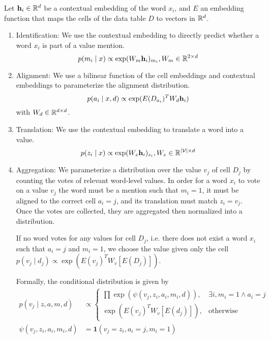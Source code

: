 \documentclass[12pt]{article}
\begin{document}
Let $\mathbf{h}_i \in \mathbb{R}^d$ be a contextual embedding of the word $x_i$,
and $E$ an embedding function that maps the cells of the data table $D$
to vectors in $\mathbb{R}^{d}$.
\begin{enumerate}
\item Identification: We use the contextual embedding to directly predict
whether a word $x_i$ is part of a value mention.
\begin{equation}
p(m_i \mid x) \propto \exp(W_m\mathbf{h}_i)_{m_i}, W_m \in \mathbb{R}^{2 \times d}
\end{equation}
\item Alignment: We use a bilinear function of the cell embeddings and
contextual embeddings to parameterize the alignment distribution.
\begin{equation}
p(a_i \mid x,d) \propto \exp(E(D_{a_i})^T W_d \mathbf{h}_i)\\
\end{equation}
with $W_d \in \mathbb{R}^{d \times d}$.
\item Translation: We use the contextual embedding to translate a word
into a value.
\begin{equation}
p(z_i \mid x) \propto \exp(W_z \mathbf{h}_i)_{z_i}, W_z \in \mathbb{R}^{|\mathcal{V}| \times d}
\end{equation}
\item Aggregation:
We parameterize a distribution over the value $v_j$ of cell $D_j$
by counting the votes of relevant word-level values.
In order for a word $x_i$ to vote on a value $v_j$
the word must be a mention such that $m_i = 1$,
it must be aligned to the correct cell $a_i = j$,
and its translation must match $z_i = v_j$.
Once the votes are collected,
they are aggregated then normalized into a distribution.

If no word votes for any values for cell $D_j$, i.e. there does not exist
a word $x_i$ such that $a_i = j$ and $m_i = 1$,
we choose the value given only the cell
$p(v_j \mid d_j) \propto \exp(E(v_j)^TW_v [E(D_j)])$.

Formally, the conditional distribution is given by
\begin{align}
p(v_j \mid z,a,m,d) &\propto \begin{cases}
    \prod \exp(\psi(v_j, z_i,a_i,m_i,d)),  & \exists i, m_i = 1 \wedge a_i = j\\
    \exp(E(v_j)^TW_v [E(d_j)]), & \textrm{otherwise}
\end{cases}\\
\psi(v_j, z_i, a_i, m_i,d) &= \mathbf{1}(v_j = z_i, a_i = j, m_i=1)%
\end{align}
\end{enumerate}
\end{document}

